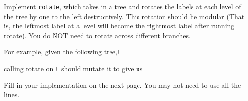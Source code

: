 \begin{blocksection}
\question Implement \texttt{rotate}, which takes in a tree and rotates the labels at each level of the tree by one to the left destructively. This rotation should be modular (That is, the leftmost label at a level will become the rightmost label after running rotate). You do NOT need to rotate across different branches.

For example, given the following tree,\texttt{t}


calling rotate on \texttt{t} should mutate it to give us 


Fill in your implementation on the next page. You may not need to use all the lines.
\end{blocksection}

